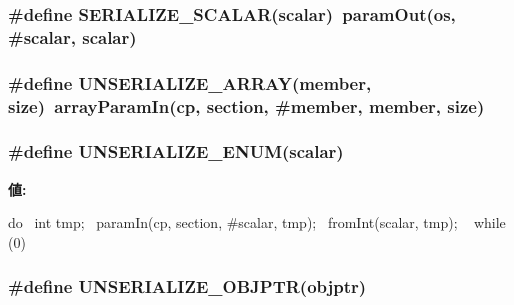 \label{serialize_8hh_a3922729f2834a70a016091e78b914140}
\hypertarget{serialize_8hh_a49163149ec656ffecff0e46aee418e29}{
\subsubsection[{SERIALIZE\_\-SCALAR}]{\setlength{\rightskip}{0pt plus 5cm}\#define SERIALIZE\_\-SCALAR(scalar)~paramOut(os, \#scalar, scalar)}}
\label{serialize_8hh_a49163149ec656ffecff0e46aee418e29}
\hypertarget{serialize_8hh_a8de12bf68d0f92f7ab8585820607932e}{
\subsubsection[{UNSERIALIZE\_\-ARRAY}]{\setlength{\rightskip}{0pt plus 5cm}\#define UNSERIALIZE\_\-ARRAY(member, \/  size)~arrayParamIn(cp, section, \#member, member, size)}}
\label{serialize_8hh_a8de12bf68d0f92f7ab8585820607932e}
\hypertarget{serialize_8hh_ad7804ac128f9563f791586cd354b37bb}{
\subsubsection[{UNSERIALIZE\_\-ENUM}]{\setlength{\rightskip}{0pt plus 5cm}\#define UNSERIALIZE\_\-ENUM(scalar)}}
\label{serialize_8hh_ad7804ac128f9563f791586cd354b37bb}
{\bfseries 値:}
\begin{DoxyCode}
do {                                           \
    int tmp;                                    \
    paramIn(cp, section, #scalar, tmp);         \
    fromInt(scalar, tmp);                    \
  } while (0)
\end{DoxyCode}
\hypertarget{serialize_8hh_ab09b68fecdcb77b21e23677ea58fd7ed}{
\subsubsection[{UNSERIALIZE\_\-OBJPTR}]{\setlength{\rightskip}{0pt plus 5cm}\#define UNSERIALIZE\_\-OBJPTR(objptr)}}
